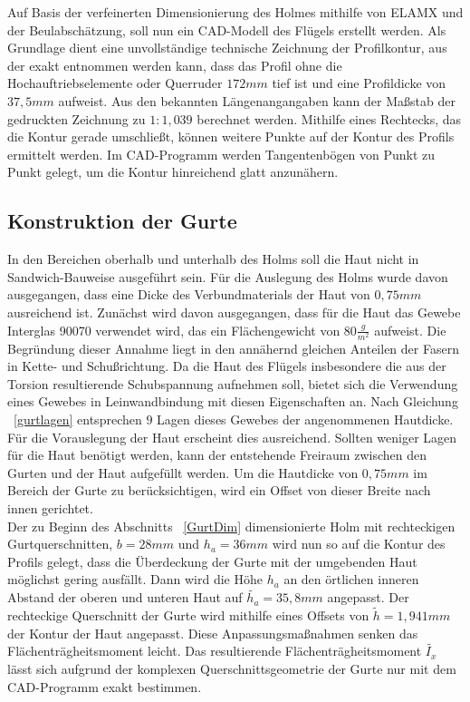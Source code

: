 Auf Basis der verfeinerten Dimensionierung des Holmes mithilfe von ELAMX und der Beulabschätzung, soll nun ein CAD-Modell des Flügels erstellt werden. Als Grundlage dient eine unvollständige technische Zeichnung der Profilkontur, aus der exakt entnommen werden kann, dass das Profil ohne die Hochauftriebselemente oder Querruder $ 172mm $ tief ist und eine Profildicke von $ 37,5mm $ aufweist. Aus den bekannten Längenangangaben kann der Maßstab der gedruckten Zeichnung zu $ 1:1,039 $ berechnet werden. Mithilfe eines Rechtecks, das die Kontur gerade umschließt, können weitere Punkte auf der Kontur des Profils ermittelt werden. Im CAD-Programm werden Tangentenbögen von Punkt zu Punkt gelegt, um die Kontur hinreichend glatt anzunähern.\\

\subsection{Konstruktion der Gurte}
\noindent In den Bereichen oberhalb und unterhalb des Holms soll die Haut nicht in Sandwich-Bauweise ausgeführt sein. Für die Auslegung des Holms wurde davon ausgegangen, dass eine Dicke des Verbundmaterials der Haut von $ 0,75mm $ ausreichend ist. Zunächst wird davon ausgegangen, dass für die Haut das Gewebe Interglas 90070 verwendet wird, das ein Flächengewicht von $ 80\frac{g}{m^{2}} $ aufweist. Die Begründung dieser Annahme liegt in den annähernd gleichen Anteilen der Fasern in Kette- und Schußrichtung. Da die Haut des Flügels insbesondere die aus der Torsion resultierende Schubspannung aufnehmen soll, bietet sich die Verwendung eines Gewebes in Leinwandbindung mit diesen Eigenschaften an. Nach Gleichung ~\ref{gurtlagen} entsprechen $ 9 $ Lagen dieses Gewebes der angenommenen Hautdicke. Für die Vorauslegung der Haut erscheint dies ausreichend. Sollten weniger Lagen für die Haut benötigt werden, kann der entstehende Freiraum zwischen den Gurten und der Haut aufgefüllt werden. Um die Hautdicke von $ 0,75mm $ im Bereich der Gurte zu berücksichtigen, wird ein Offset von dieser Breite nach innen gerichtet.\\
\noindent Der zu Beginn des Abschnitts ~\ref{GurtDim} dimensionierte Holm mit rechteckigen Gurtquerschnitten, $ b=28mm $ und $ h_{a}=36mm $ wird nun so auf die Kontur des Profils gelegt, dass die Überdeckung der Gurte mit der umgebenden Haut möglichst gering ausfällt. Dann wird die Höhe $ h_{a} $ an den örtlichen inneren Abstand der oberen und unteren Haut auf $ \tilde{h_{a}}=35,8mm $ angepasst. Der rechteckige Querschnitt der Gurte wird mithilfe eines Offsets von $ \tilde{h}=1,941mm $ der Kontur der Haut angepasst. Diese Anpassungsmaßnahmen senken das Flächenträgheitsmoment leicht. Das resultierende Flächenträgheitsmoment $ \tilde{I_{x}} $ lässt sich aufgrund der komplexen Querschnittsgeometrie der Gurte nur mit dem CAD-Programm exakt bestimmen. 
